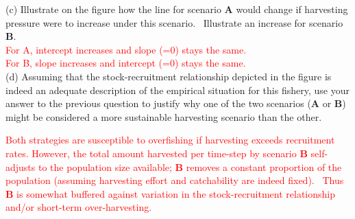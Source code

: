 \documentclass{article}
\begin{document}
(c) Illustrate on the figure how the line for scenario \textbf{A} would change if harvesting pressure were to increase under this scenario.  Illustrate an increase for scenario \textbf{B}. \\
\textcolor{red}{For A, intercept increases and slope (=0) stays the same.}\\
\textcolor{red}{For B, slope increases and intercept (=0) stays the same.}\\

(d) Assuming that the stock-recruitment relationship depicted in the figure is indeed an adequate description of the empirical situation for this fishery, use your answer to the previous question to justify why one of the two scenarios (\textbf{A} or \textbf{B}) might be considered a more sustainable harvesting scenario than the other. 

\textcolor{red}{Both strategies are susceptible to overfishing if harvesting exceeds recruitment rates.
However, the total amount harvested per time-step by scenario \textbf{B} self-adjusts to the population size available; \textbf{B} removes a constant proportion of the population (assuming harvesting effort and catchability are indeed fixed).  Thus \textbf{B} is somewhat buffered against variation in the stock-recruitment relationship and/or short-term over-harvesting.}
\end{document}
